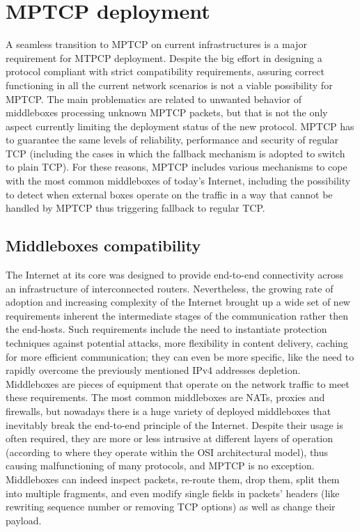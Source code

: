 \section{MPTCP deployment}
A seamless transition to MPTCP on current infrastructures is a major requirement for MTPCP deployment.
Despite the big effort in designing a protocol compliant with strict compatibility requirements, assuring correct functioning in all the current network scenarios is not a viable possibility for MPTCP. The main problematics are related to unwanted behavior of middleboxes processing unknown MPTCP packets, but that is not the only aspect currently limiting the deployment status of the new protocol. MPTCP has to guarantee the same levels of reliability, performance and security of regular TCP (including the cases in which the fallback mechanism is adopted to switch to plain TCP). 
For these reasons, MPTCP includes various mechanisms to cope with the most common middleboxes of today's Internet, including the possibility to detect when external boxes operate on the traffic in a way that cannot be handled by MPTCP thus triggering fallback to regular TCP.


\subsection{Middleboxes compatibility}
The Internet at its core was designed to provide end-to-end connectivity across an infrastructure of interconnected routers. Nevertheless, the growing rate of adoption and increasing complexity of the Internet brought up a wide set of new requirements inherent the intermediate stages of the communication rather then the end-hosts. Such requirements include the need to instantiate protection techniques against potential attacks, more flexibility in content delivery, caching for more efficient communication; they can even be more specific, like the need to rapidly overcome the previously mentioned IPv4 addresses depletion. Middleboxes are pieces of equipment that operate on the network traffic to meet these requirements. The most common middleboxes are NATs, proxies and firewalls, but nowadays there is a huge variety of deployed middleboxes that inevitably break the end-to-end principle of the Internet. Despite their usage is often required, they are more or less intrusive at different layers of operation (according to where they operate within the OSI architectural model), thus causing malfunctioning of many protocols, and MPTCP is no exception. Middleboxes can indeed inspect packets, re-route them, drop them, split them into multiple fragments, and even modify single fields in packets' headers (like rewriting sequence number or removing TCP options) as well as change their payload.


